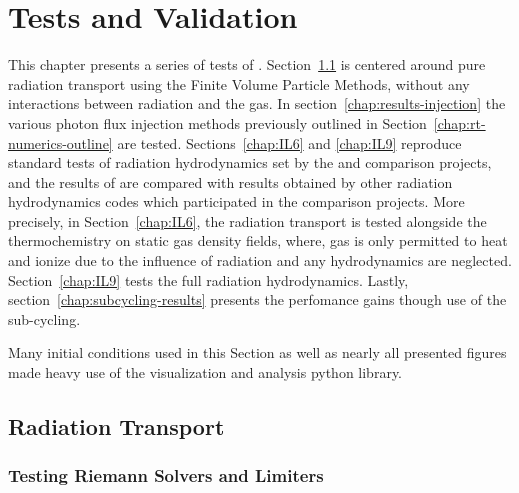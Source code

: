 \chapter{Tests and Validation}\label{chap:rt-validation}

This chapter presents a series of tests of \GEARRT. Section~\ref{chap:results-transport} is centered
around pure radiation transport using the Finite Volume Particle Methods, without any interactions
between radiation and the gas. In section~\ref{chap:results-injection} the various photon flux
injection methods previously outlined in Section~\ref{chap:rt-numerics-outline} are tested.
Sections~\ref{chap:IL6} and \ref{chap:IL9} reproduce standard tests of radiation hydrodynamics set
by the \citet{ilievCosmologicalRadiativeTransfer2006} and
\citet{ilievCosmologicalRadiativeTransfer2009} comparison projects, and the results of \GEARRT are
compared with results obtained by other radiation hydrodynamics codes which participated in the
comparison projects. More precisely, in Section~\ref{chap:IL6}, the radiation transport is tested
alongside the thermochemistry on static gas density fields, where, gas is only permitted to heat and
ionize due to the influence of radiation and any hydrodynamics are neglected. Section~\ref{chap:IL9}
tests the full radiation hydrodynamics. Lastly, section~\ref{chap:subcycling-results} presents the
perfomance gains though use of the sub-cycling.

Many initial conditions used in this Section as well as nearly all presented figures made heavy use
of the  \citep{borrowSwiftsimioPythonLibrary2020} visualization and analysis
python library.






\section{Radiation Transport}\label{chap:results-transport}



\subsection{Testing Riemann Solvers and Limiters}\label{chap:rt-riemann-limiters}



